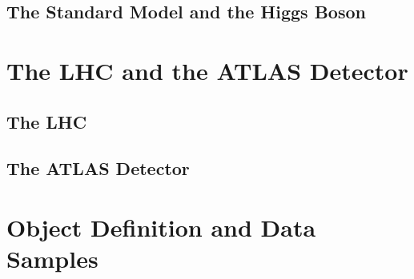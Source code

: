\documentclass[12pt]{report}	%
\theoremstyle{definition}
\theoremstyle{remark}
\begin{document}
\section{The Standard Model and the Higgs Boson}
\label{sec:sm}

% 

%



\chapter{The LHC and the ATLAS Detector}
\label{part:lhcAtlas}


\section{The LHC}
\label{sec:lhc}



\section{The ATLAS Detector}
\label{sec:atlas}


\chapter{Object Definition and Data Samples}
\label{part:objMC}
\end{document}
